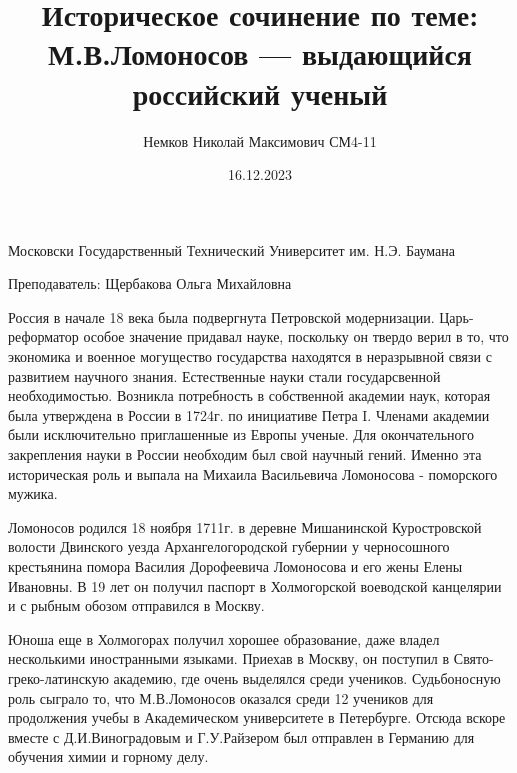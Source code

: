 

\title{Историческое сочинение по теме: М.В.Ломоносов --- выдающийся российский ученый}
\author{Немков Николай Максимович СМ4-11}

\date{16.12.2023}



\maketitle
\begin{center}
Московски Государственный Технический Университет им. Н.Э. Баумана

Преподаватель: Щербакова Ольга Михайловна
\end{center}

\newpage

	Россия в начале 18 века была подвергнута Петровской модернизации. Царь-реформатор особое значение придавал науке, поскольку он твердо верил в то, что экономика и военное могущество государства находятся в неразрывной связи с развитием научного знания. Естественные науки стали государсвенной необходимостью. Возникла потребность в собственной академии наук, которая была утверждена в России в 1724г. по инициативе Петра I. Членами академии были исключительно приглашенные из Европы ученые. Для окончательного закрепления науки в России необходим был свой научный гений. Именно эта историческая роль и выпала на Михаила Васильевича Ломоносова - поморского мужика.

	Ломоносов родился 18 ноября 1711г. в деревне Мишанинской Куростровской волости Двинского уезда Архангелогородской губернии у черносошного крестьянина помора Василия Дорофеевича Ломоносова и его жены Елены Ивановны. В 19 лет он получил паспорт в Холмогорской воеводской канцелярии и с рыбным обозом отправился в Москву.

	Юноша еще в Холмогорах получил хорошее образование, даже владел несколькими иностранными языками. Приехав в Москву, он поступил в Свято-греко-латинскую академию, где очень выделялся среди учеников. Судьбоносную роль сыграло то, что М.В.Ломоносов оказался среди 12 учеников для продолжения учебы в Академическом университете в Петербурге. Отсюда вскоре вместе с Д.И.Виноградовым и Г.У.Райзером был отправлен в Германию для обучения химии и горному делу.

